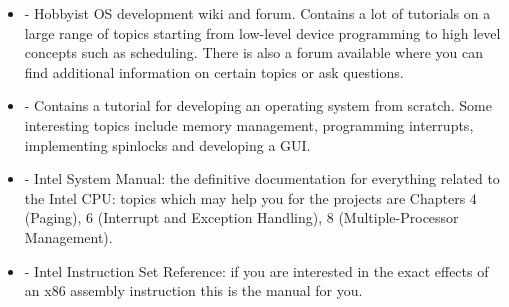 \begin{itemize}
	\item \cite{osdev} - Hobbyist OS development wiki and forum. Contains a lot of tutorials on a large range of topics
starting from low-level device programming to high level concepts such as scheduling. There is also a forum available
where you can find additional information on certain topics or ask questions.

	\item \cite{osdever} - Contains a tutorial for developing an operating system from scratch. Some interesting topics
include memory management, programming interrupts, implementing spinlocks and developing a GUI.

	\item \cite{intelSys} - Intel System Manual: the definitive documentation for everything related to the Intel CPU:
topics which may help you for the projects are Chapters 4 (Paging), 6 (Interrupt and Exception Handling), 8 (Multiple-Processor
Management).

	\item \cite{intelInstr} - Intel Instruction Set Reference: if you are interested in the exact effects of an x86
assembly instruction this is the manual for you.

\end{itemize}